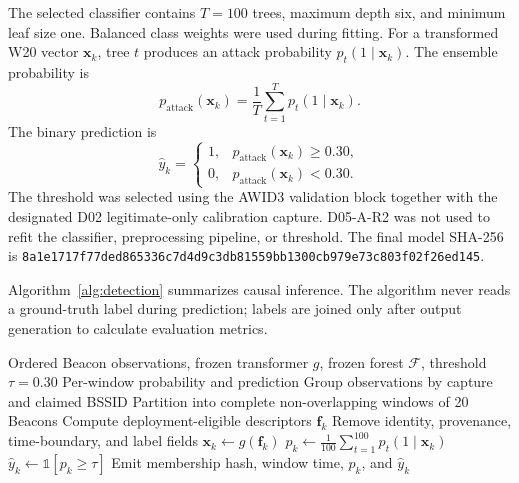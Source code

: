 \documentclass[conference]{IEEEtran}
\begin{document}
The selected classifier contains $T=100$ trees, maximum depth six, and minimum leaf size one. Balanced class weights were used during fitting. For a transformed W20 vector $\mathbf{x}_k$, tree $t$ produces an attack probability $p_t(1\mid\mathbf{x}_k)$. The ensemble probability is
\begin{equation}
p_{\mathrm{attack}}(\mathbf{x}_k)=\frac{1}{T}\sum_{t=1}^{T}p_t(1\mid\mathbf{x}_k).
\label{eq:rfprob}
\end{equation}
The binary prediction is
\begin{equation}
\hat{y}_k=\begin{cases}
1,&p_{\mathrm{attack}}(\mathbf{x}_k)\geq 0.30,\\
0,&p_{\mathrm{attack}}(\mathbf{x}_k)<0.30.
\end{cases}
\label{eq:threshold}
\end{equation}
The threshold was selected using the AWID3 validation block together with the designated D02 legitimate-only calibration capture. D05-A-R2 was not used to refit the classifier, preprocessing pipeline, or threshold. The final model SHA-256 is \texttt{8a1e1717f77ded865\allowbreak{}336c7d4d9c3db815\allowbreak{}59bb1300cb979e73\allowbreak{}c803f02f26ed145}.

Algorithm~\ref{alg:detection} summarizes causal inference. The algorithm never reads a ground-truth label during prediction; labels are joined only after output generation to calculate evaluation metrics.

\begin{algorithm}[t]
\caption{Causal RF-Only W20 Detection}
\label{alg:detection}
\begin{algorithmic}[1]
\Require Ordered Beacon observations, frozen transformer $g$, frozen forest $\mathcal{F}$, threshold $\tau=0.30$
\Ensure Per-window probability and prediction
\State Group observations by capture and claimed BSSID
    \State Partition into complete non-overlapping windows of 20 Beacons
        \State Compute deployment-eligible descriptors $\mathbf{f}_k$
        \State Remove identity, provenance, time-boundary, and label fields
        \State $\mathbf{x}_k \gets g(\mathbf{f}_k)$
        \State $p_k \gets \frac{1}{100}\sum_{t=1}^{100}p_t(1\mid\mathbf{x}_k)$
        \State $\hat y_k \gets \mathbb{1}[p_k\geq\tau]$
        \State Emit membership hash, window time, $p_k$, and $\hat y_k$
    \EndFor
\EndFor
\end{algorithmic}
\end{algorithm}
\end{document}
